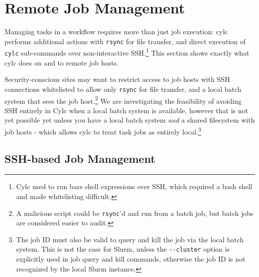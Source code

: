 \section{Remote Job Management}

Managing tasks in a workflow requires more than just job execution: cylc
performs additional actions with \lstinline=rsync= for file transfer, and
direct execution of \lstinline=cylc= sub-commands over non-interactive
SSH.\footnote{Cylc used to run bare shell expressions over SSH, which required
a bash shell and made whitelisting difficult.} This section shows exactly what
cylc does on and to remote job hosts.

Security-conscious sites may want to restrict access to job hosts with SSH
connections whitelisted to allow only \lstinline=rsync= for file transfer, and
a local batch system that sees the job host.\footnote{A malicious
script could be \lstinline=rsync='d and run from a batch job, but batch
jobs are considered easier to audit.}  We are investigating the feasibility
of avoiding SSH entirely in Cylc when a local batch system is available,
however that is not yet possible yet unless you have a local batch system {\em
and} a shared filesystem with job hosts - which allows cylc to treat task
jobs as entirely local.\footnote{The job ID must also be valid to query and
kill the job via the local batch system. This is not the case for Slurm, unless
the \lstinline=--cluster= option is explicitly used in job query and kill
commands, otherwise the job ID is not recognized by the local Slurm instance.}

\subsection{SSH-based Job Management}

